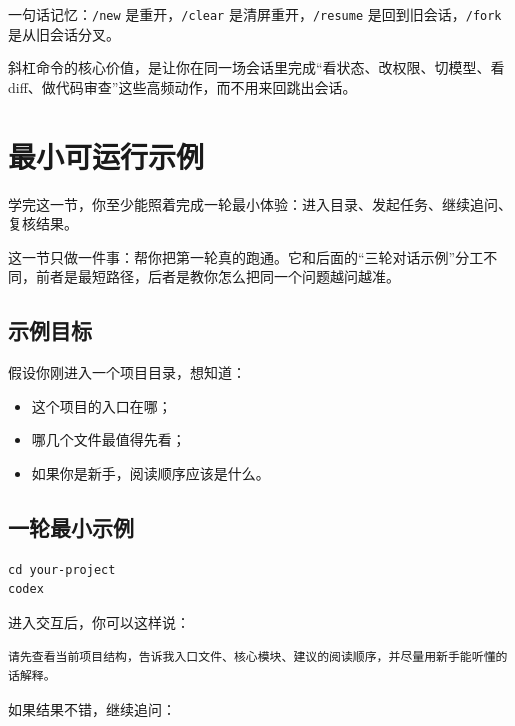 \documentclass[UTF8,a4paper,12pt]{ctexart}
\begin{document}
\begin{tipbox}
一句话记忆：\texttt{/new} 是重开，\texttt{/clear} 是清屏重开，\texttt{/resume} 是回到旧会话，\texttt{/fork} 是从旧会话分叉。
\end{tipbox}

\begin{sumbox}
斜杠命令的核心价值，是让你在同一场会话里完成“看状态、改权限、切模型、看 diff、做代码审查”这些高频动作，而不用来回跳出会话。
\end{sumbox}

\section{最小可运行示例}

\begin{learnbox}
学完这一节，你至少能照着完成一轮最小体验：进入目录、发起任务、继续追问、复核结果。
\end{learnbox}

这一节只做一件事：帮你把第一轮真的跑通。它和后面的“三轮对话示例”分工不同，前者是最短路径，后者是教你怎么把同一个问题越问越准。

\subsection{示例目标}

假设你刚进入一个项目目录，想知道：
\begin{itemize}
  \item 这个项目的入口在哪；
  \item 哪几个文件最值得先看；
  \item 如果你是新手，阅读顺序应该是什么。
\end{itemize}

\subsection{一轮最小示例}

\begin{lstlisting}[style=cli]
cd your-project
codex
\end{lstlisting}

进入交互后，你可以这样说：

\begin{lstlisting}[style=prompt]
请先查看当前项目结构，告诉我入口文件、核心模块、建议的阅读顺序，并尽量用新手能听懂的话解释。
\end{lstlisting}

如果结果不错，继续追问：
\end{document}
